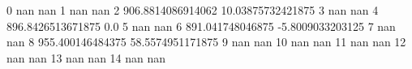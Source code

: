 0 nan nan
1 nan nan
2 906.8814086914062 10.03875732421875
3 nan nan
4 896.8426513671875 0.0
5 nan nan
6 891.041748046875 -5.8009033203125
7 nan nan
8 955.400146484375 58.5574951171875
9 nan nan
10 nan nan
11 nan nan
12 nan nan
13 nan nan
14 nan nan
